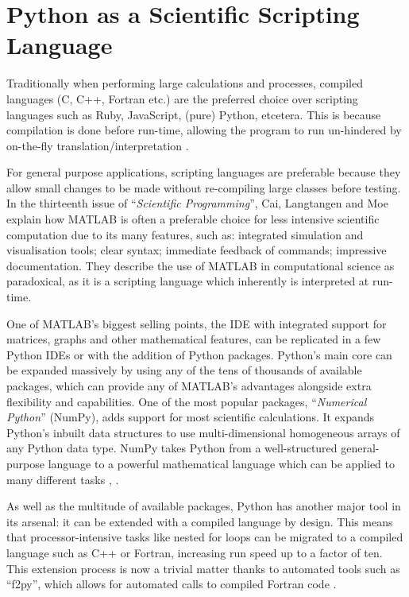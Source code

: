 \documentclass{report}
\newcommand{\propernoun}[1]{\enquote{\textit{#1}}}
\begin{document}
    
    \section{Python as a Scientific Scripting Language}
    Traditionally when performing large calculations and processes, compiled languages (C, C++, Fortran etc.) are the preferred choice over scripting languages such as Ruby, JavaScript, (pure) Python, etcetera. This is because compilation is done before run-time, allowing the program to run un-hindered by on-the-fly translation/interpretation \cite{Cai2005}.
    
    For general purpose applications, scripting languages are preferable because they allow small changes to be made without re-compiling large classes before testing. In the thirteenth issue of \propernoun{Scientific Programming}, Cai, Langtangen and Moe \cite{Cai2005} explain how MATLAB is often a preferable choice for less intensive scientific computation due to its many features, such as: integrated simulation and visualisation tools; clear syntax; immediate feedback of commands; impressive documentation. They describe the use of MATLAB in computational science as paradoxical, as it is a scripting language which inherently is interpreted at run-time.
    
    One of MATLAB's biggest selling points, the IDE with integrated support for matrices, graphs and other mathematical features, can be replicated in a few Python IDEs or with the addition of Python packages. Python's main core can be expanded massively by using any of the tens of thousands of available packages, which can provide any of MATLAB's advantages alongside extra flexibility and capabilities. One of the most popular packages, \propernoun{Numerical Python} (NumPy), adds support for most scientific calculations. It expands Python's inbuilt data structures to use multi-dimensional homogeneous arrays of any Python data type. NumPy takes Python from a well-structured general-purpose language to a powerful mathematical language which can be applied to many different tasks \cite{Cai2005}, \cite{Oliphant2006}.
    
    As well as the multitude of available packages, Python has another major tool in its arsenal: it can be extended with a compiled language by design. This means that processor-intensive tasks like nested for loops can be migrated to a compiled language such as C++ or Fortran, increasing run speed up to a factor of ten. This extension process is now a trivial matter thanks to automated tools such as \enquote{f2py}, which allows for automated calls to compiled Fortran code \cite{Oliphant2006}.
    
\end{document}
